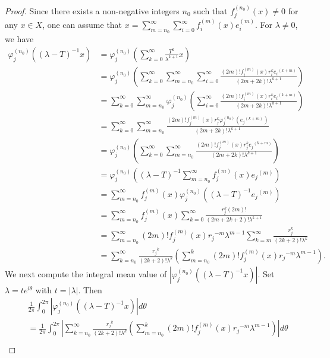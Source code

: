 \documentclass[10pt,a4paper]{amsart}
\begin{document}
\begin{proof}
Since there exists a non-negative integers $n_0$ such that
$f_{j}^{(n_0)}(x)\neq 0$ for any $x\in X$,
one can assume that
$x=\sum_{m=n_0}^{\infty}\sum_{i=0}^{\infty}f_{i}^{(m)}(x)e_i^{(m)}$.
For $\lambda\neq 0$, we have
\begin{align*}
\varphi_{j}^{(n_0)}\left((\lambda-T)^{-1}x\right)
&=\varphi_{j}^{(n_0)}\left(\sum_{k=0}^{\infty}\frac{T^k}{\lambda^{k+1}}x\right)\\
&=\varphi_{j}^{(n_0)}\left(\sum_{k=0}^{\infty}\sum_{m=n_0}^{\infty}\sum_{i=0}^{\infty}\frac{(2m)!f_i^{(m)}(x)r_i^k{e_i}^{(k+m)}}{(2m+2k)!\lambda^{k+1}}\right)\\
&=\sum_{k=0}^{\infty}\sum_{m=n_0}^{\infty}\varphi_{j}^{(n_0)}\left(\sum_{i=0}^{\infty}\frac{(2m)!f_i^{(m)}(x)r_i^k{e_i}^{(k+m)}}{(2m+2k)!\lambda^{k+1}}\right)\\
&=\sum_{k=0}^{\infty}\sum_{m=n_0}^{\infty}\frac{(2m)!f_j^{(m)}(x)r_j^k\varphi_{j}^{(n_0)}\left({e_j}^{(k+m)}\right)}{(2m+2k)!\lambda^{k+1}}\\
&=\varphi_{j}^{(n_0)}\left(\sum_{k=0}^{\infty}\sum_{m=n_0}^{\infty}\frac{(2m)!f_j^{(m)}(x)r_j^k{e_j}^{(k+m)}}{(2m+2k)!\lambda^{k+1}}\right)\\
&=\varphi_{j}^{(n_0)}\left((\lambda-T)^{-1}\sum_{m=n_0}^{\infty}f_j^{(m)}(x){e_j}^{(m)}\right)\\
&=\sum_{m=n_0}^{\infty}f_j^{(m)}(x)\varphi_{j}^{(n_0)}\left((\lambda-T)^{-1}{e_j}^{(m)}\right)\\
&=\sum_{m=n_0}^{\infty}f_j^{(m)}(x)
\sum_{k=0}^{\infty}\frac{r_j^k (2m)!}{(2m+2k+2)!\lambda^{k+1}}\\
&=\sum_{m=n_0}^{\infty}(2m)!f_j^{(m)}(x){r_j}^{-m}\lambda^{m-1}\sum_{k=m}^{\infty}\frac{r_j^k}{(2k+2)!\lambda^{k}}\\
&=\sum_{k=n_0}^{\infty}\frac{{r_j}^k}{(2k+2)!\lambda^{k}}\left(\sum_{m=n_0}^{k}(2m)!f_j^{(m)}(x){r_j}^{-m}\lambda^{m-1}\right).
\end{align*}
We next compute the integral mean value of $\left|\varphi_{j}^{(n_0)}\left((\lambda-T)^{-1}x\right)\right|$.
Set $\lambda=te^{i\theta}$ with $t=|\lambda|$.
Then
\begin{align*}
&\frac{1}{2\pi}\int_{0}^{2\pi}\left|\varphi_{j}^{(n_0)}\left((\lambda-T)^{-1}x\right)\right| d\theta\\
&=
\frac{1}{2\pi}\int_{0}^{2\pi} \left|\sum\limits_{k=n_0}^{\infty}\frac{{r_j}^k}{(2k+2)!\lambda^{k}}\left(\sum_{m=n_0}^{k}(2m)!f_j^{(m)}(x){r_j}^{-m}\lambda^{m-1}\right)\right|d\theta\\

\end{align*}
\end{proof}
\end{document}
